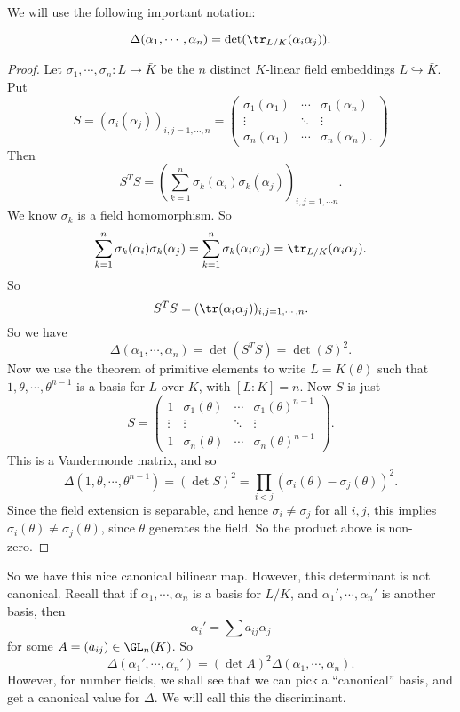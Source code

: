 \documentclass[a4paper]{article}
\begin{document}
We will use the following important notation:
\begin{notation}
  \[
    \Delta(\alpha_1, \cdots, \alpha_n) = \det(\tr_{L/K}(\alpha_i \alpha_j)).
  \]
\end{notation}

\begin{proof}
  Let $\sigma_1, \cdots, \sigma_n: L \to \bar{K}$ be the $n$ distinct $K$-linear field embeddings $L \hookrightarrow \bar{K}$. Put
  \[
    S = (\sigma_i(\alpha_j))_{i, j = 1, \cdots, n} =
    \begin{pmatrix}
      \sigma_1(\alpha_1) & \cdots & \sigma_1(\alpha_n)\\
      \vdots & \ddots & \vdots\\
      \sigma_n(\alpha_1) & \cdots & \sigma_n(\alpha_n).
    \end{pmatrix}
  \]
  Then
  \[
    S^T S = \left(\sum_{k = 1}^n \sigma_k(\alpha_i)\sigma_k(\alpha_j)\right)_{i,j = 1, \cdots n}.
  \]
  We know $\sigma_k$ is a field homomorphism. So
  \[
    \sum_{k = 1}^n \sigma_k (\alpha_i)\sigma_k(\alpha_j) = \sum_{k = 1}^n \sigma_k(\alpha_i \alpha_j) = \tr_{L/K}(\alpha_i \alpha_j).
  \]
  So
  \[
    S^T S = (\tr(\alpha_i\alpha_j))_{i, j = 1, \cdots, n}.
  \]
  So we have
  \[
    \Delta(\alpha_1, \cdots, \alpha_n) = \det(S^T S) = \det(S)^2.
  \]
  Now we use the theorem of primitive elements to write $L = K(\theta)$ such that $1, \theta, \cdots, \theta^{n - 1}$ is a basis for $L$ over $K$, with $[L:K] = n$. Now $S$ is just
  \[
    S =
    \begin{pmatrix}
      1 & \sigma_1(\theta) & \cdots & \sigma_1(\theta)^{n - 1}\\
      \vdots & \vdots & \ddots & \vdots\\
      1 & \sigma_n(\theta) & \cdots & \sigma_n(\theta)^{n - 1}
    \end{pmatrix}.
  \]
  This is a Vandermonde matrix, and so
  \[
    \Delta(1, \theta, \cdots, \theta^{n - 1}) = (\det S)^2 = \prod_{i < j} (\sigma_i(\theta) - \sigma_j(\theta))^2.
  \]
  Since the field extension is separable, and hence $\sigma_i \not= \sigma_j$ for all $i, j$, this implies $\sigma_i (\theta) \not= \sigma_j(\theta)$, since $\theta$ generates the field. So the product above is non-zero.
\end{proof}
So we have this nice canonical bilinear map. However, this determinant is not canonical. Recall that if $\alpha_1, \cdots, \alpha_n$ is a basis for $L/K$, and $\alpha_1', \cdots, \alpha_n'$ is another basis, then
\[
  \alpha_i' = \sum a_{ij}\alpha_j
\]
for some $A = (a_{ij}) \in \GL_n(K)$. So
\[
  \Delta(\alpha_1', \cdots, \alpha_n') = (\det A)^2 \Delta(\alpha_1, \cdots, \alpha_n).
\]
However, for number fields, we shall see that we can pick a ``canonical'' basis, and get a canonical value for $\Delta$. We will call this the discriminant.
\end{document}

